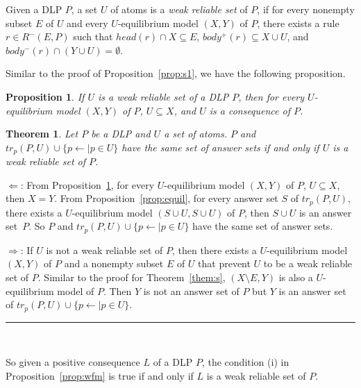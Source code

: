 \documentclass{article}
\newtheorem{theorem}{Theorem}
\newtheorem{proposition}{Proposition}
\newtheorem{corollary}[theorem]{Corollary}
\newenvironment{proofs}{{\bf Proof Sketch:}}{\rule{2mm}{2mm}\\[-.5em] }
\newcommand{\trp}{tr_p}
\begin{document}
Given a DLP $P$, a set $U$ of atoms is a {\em weak reliable set} of $P$, if for every nonempty subset $E$ of $U$ and every $U$-equilibrium model $(X, Y)$ of $P$, there exists a rule $r\in R^-(E, P)$ such that
$head(r)\cap X \subseteq E$, $body^+(r) \subseteq X\cup U$, and $body^-(r)\cap (Y\cup U) =\emptyset$.

Similar to the proof of Proposition~\ref{prop:s1}, we have the following proposition.
\begin{proposition}\label{prop:w1}
  If $U$ is a weak reliable set of a DLP $P$, then for every $U$-equilibrium model $(X, Y)$ of $P$, $U\subseteq X$, and $U$ is a consequence of $P$.
\end{proposition}



\begin{theorem}\label{them:w}
  Let $P$ be a DLP and $U$ a set of atoms. $P$ and $\trp(P, U) \cup \{p\gets \mid p\in U\}$ have the same set of answer sets if and only if $U$ is a weak reliable set of $P$.
\end{theorem}
\begin{proofs}
  $\Leftarrow$: From Proposition~\ref{prop:w1}, for every $U$-equilibrium model $(X, Y)$ of $P$, $U\subseteq X$, then $X = Y$. From Proposition~\ref{prop:equil}, for every answer set $S$ of $\trp(P, U)$, there exists a $U$-equilibrium model $(S\cup U, S\cup U)$ of $P$, then
  $S\cup U$ is an answer set~$P$. So $P$ and $\trp(P, U) \cup \{p\gets \mid p\in U\}$ have the same set of answer sets.

  $\Rightarrow$: If $U$ is not a weak reliable set of $P$, then there exists a $U$-equilibrium model $(X, Y)$ of $P$ and a nonempty subset $E$ of $U$ that prevent $U$ to be a weak reliable set of $P$. Similar to the proof for Theorem~\ref{them:s}, $(X\setminus E, Y)$ is also a $U$-equilibrium model of $P$. Then $Y$ is not an answer set of $P$ but $Y$ is an answer set of $\trp(P, U) \cup \{p\gets \mid p\in U\}$.
\end{proofs}

So given a positive consequence $L$ of a DLP $P$, the condition (i) in Proposition~\ref{prop:wfm} is true if and only if $L$ is a weak reliable set of $P$.

\end{document}
